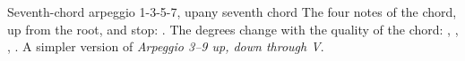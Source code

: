 \begin{patternbox}{Seventh-chord arpeggio 1-3-5-7, up}{any seventh chord}
The four notes of the chord, up from the root, and stop: .
The degrees change with the quality of the chord:
 ,  ,
 ,  .
A simpler version of \emph{Arpeggio 3--9 up, down through V}.
\patternwhereline
\end{patternbox}
